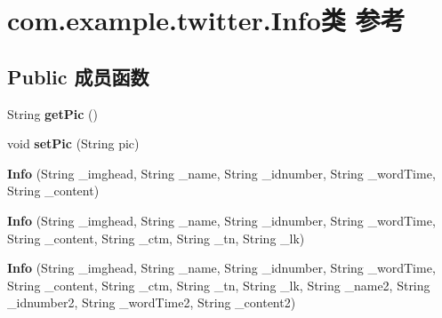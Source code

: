 \hypertarget{classcom_1_1example_1_1twitter_1_1_info}{}\section{com.\+example.\+twitter.\+Info类 参考}
\label{classcom_1_1example_1_1twitter_1_1_info}
\subsection*{Public 成员函数}
\begin{DoxyCompactItemize}
\item 
\mbox{\label{classcom_1_1example_1_1twitter_1_1_info_a0cc0dfba9b78715358667b4861eb9075}} 
String {\bfseries get\+Pic} ()
\item 
\mbox{\label{classcom_1_1example_1_1twitter_1_1_info_ae33a2771cf3f5f3d60f455c002c9548e}} 
void {\bfseries set\+Pic} (String pic)
\item 
\mbox{\label{classcom_1_1example_1_1twitter_1_1_info_a4d9c06169a3f1f1829436bb6d3a11a6a}} 
{\bfseries Info} (String \+\_\+imghead, String \+\_\+name, String \+\_\+idnumber, String \+\_\+word\+Time, String \+\_\+content)
\item 
\mbox{\label{classcom_1_1example_1_1twitter_1_1_info_ae3e87fa7e176f7318f0351ee71a16edc}} 
{\bfseries Info} (String \+\_\+imghead, String \+\_\+name, String \+\_\+idnumber, String \+\_\+word\+Time, String \+\_\+content, String \+\_\+ctm, String \+\_\+tn, String \+\_\+lk)
\item 
\mbox{\label{classcom_1_1example_1_1twitter_1_1_info_a6cb59c0c724443b00f019606698f8f51}} 
{\bfseries Info} (String \+\_\+imghead, String \+\_\+name, String \+\_\+idnumber, String \+\_\+word\+Time, String \+\_\+content, String \+\_\+ctm, String \+\_\+tn, String \+\_\+lk, String \+\_\+name2, String \+\_\+idnumber2, String \+\_\+word\+Time2, String \+\_\+content2)
\item 
\mbox{\label{classcom_1_1example_1_1twitter_1_1_info_ac124fd0f9a97205fdd2ab7735c22db34}} 

\end{DoxyCompactItemize}
